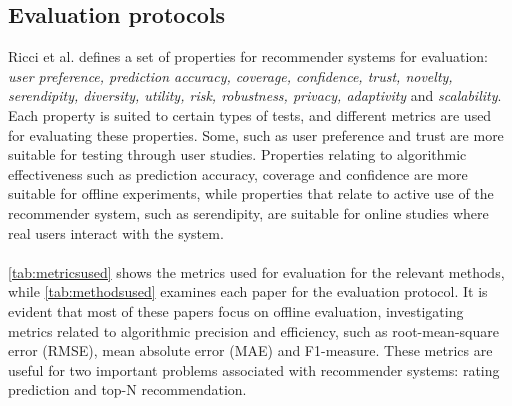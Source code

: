 \subsection{Evaluation protocols}\label{sec:evaluationmetrics}
Ricci et al.\cite{RecommenderHandbook2015} defines a set of properties for recommender systems for evaluation: \textit{user preference, prediction accuracy, coverage, confidence, trust, novelty, serendipity, diversity, utility, risk, robustness, privacy, adaptivity} and \textit{scalability}.
Each property is suited to certain types of tests, and different metrics are used for evaluating these properties.
Some, such as user preference and trust are more suitable for testing through user studies.
Properties relating to algorithmic effectiveness such as prediction accuracy, coverage and confidence are more suitable for offline experiments, while properties that relate to active use of the recommender system, such as serendipity, are suitable for online studies where real users interact with the system.
\\\\
\autoref{tab:metricsused} shows the metrics used for evaluation for the relevant methods, while \autoref{tab:methodsused} examines each paper for the evaluation protocol.
It is evident that most of these papers focus on offline evaluation, investigating metrics related to algorithmic precision and efficiency, such as root-mean-square error (RMSE), mean absolute error (MAE) and F1-measure.
These metrics are useful for two important problems associated with recommender systems: rating prediction and top-N recommendation\cite{RecommenderHandbook2015}.
\\
